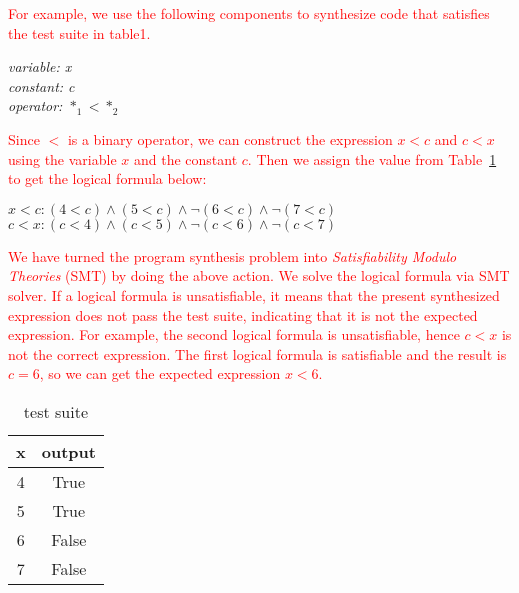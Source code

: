 \documentclass[a4j,dvipdfmx]{article}
\begin{document}
\textcolor{red}{
For example, we use the following components to synthesize code that satisfies the test suite in table1.
}

\begin{minipage}{\textwidth}
    \vspace{0.2cm}
    \textsl{\hspace{0.3cm}variable: x\\\hspace{0.3cm}constant: c\\\hspace{0.3cm}operator: $*_1<*_2$\\}
\end{minipage}
\textcolor{red}{
Since $<$ is a binary operator, we can construct the expression $x<c$ and $c<x$ using the variable $x$ and the constant $c$. Then we assign the value from Table~\ref{test} to get the logical formula below:
}

\begin{minipage}{\textwidth}
    \vspace{0.2cm}
    \textsl{\hspace{0.3cm}$x<c: (4<c)\wedge(5<c)\wedge\neg(6<c)\wedge\neg(7<c)$\\\hspace{0.3cm}$c<x: (c<4)\wedge(c<5)\wedge\neg(c<6)\wedge\neg(c<7)$\\}
\end{minipage}
\textcolor{red}{
We have turned the program synthesis problem into {\it Satisfiability Modulo Theories} (SMT) by doing the above action. We solve the logical formula via SMT solver. If a logical formula is unsatisfiable, it means that the present synthesized expression does not pass the test suite, indicating that it is not the expected expression. For example, the second logical formula is unsatisfiable, hence $c<x$ is not the correct expression. The first logical formula is satisfiable and the result is $c=6$, so we can get the expected expression $x<6$.
}

\begin{table}[h]
  \caption{test suite}
  \label{test}
  \centering
  \begin{tabular}{|c|c|}
    \hline
     x & output \\
    \hline
     4 & True \\
     5 & True \\
     6 & False \\
     7 & False \\
    \hline
  \end{tabular}
\end{table}
\end{document}
